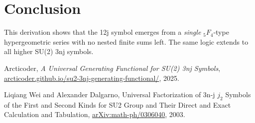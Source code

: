 \documentclass{article}
\begin{document}
\section*{Conclusion}

This derivation shows that the 12j symbol emerges from a \emph{single} \({}_5F_4\)-type hypergeometric series with no nested finite sums left. The same logic extends to all higher SU(2) 3nj symbols.

\begin{thebibliography}{9}

Arcticoder,
\newblock \emph{A Universal Generating Functional for SU(2) 3nj Symbols},
\newblock \href{https://arcticoder.github.io/su2-3nj-generating-functional/}{arcticoder.github.io/su2-3nj-generating-functional/}, 2025.

Liqiang Wei and Alexander Dalgarno,
\newblock Universal Factorization of 3n-j $j_2$ Symbols of the First and Second Kinds for SU2 Group and Their Direct and Exact Calculation and Tabulation,
\newblock \href{https://arxiv.org/abs/math-ph/0306040}{arXiv:math-ph/0306040}, 2003.

\end{thebibliography}
\end{document}
